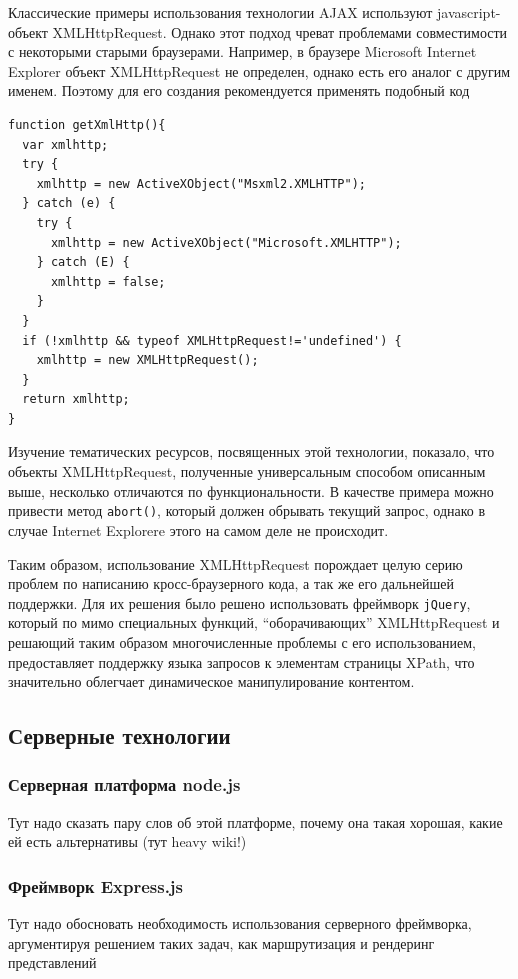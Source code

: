 \documentclass[12pt, a4paper]{article}
\begin{document}
Классические примеры использования технологии AJAX используют javascript-объект
XMLHttpRequest. Однако этот подход чреват проблемами совместимости с некоторыми
старыми браузерами. Например, в браузере Microsoft Internet Explorer объект
XMLHttpRequest не определен, однако есть его аналог с другим именем. Поэтому для
его создания рекомендуется применять подобный код
\begin{lstlisting}
function getXmlHttp(){
  var xmlhttp;
  try {
    xmlhttp = new ActiveXObject("Msxml2.XMLHTTP");
  } catch (e) {
    try {
      xmlhttp = new ActiveXObject("Microsoft.XMLHTTP");
    } catch (E) {
      xmlhttp = false;
    }
  }
  if (!xmlhttp && typeof XMLHttpRequest!='undefined') {
    xmlhttp = new XMLHttpRequest();
  }
  return xmlhttp;
}
\end{lstlisting}
Изучение тематических ресурсов, посвященных этой технологии, показало, что
объекты XMLHttpRequest, полученные универсальным способом описанным выше,
несколько отличаются по функциональности. В качестве примера можно привести
метод \texttt{abort()}, который должен обрывать текущий запрос, однако в случае
Internet Explorere этого на самом деле не происходит.

Таким образом, использование XMLHttpRequest порождает целую серию проблем по
написанию кросс-браузерного кода, а так же его дальнейшей поддержки. Для их
решения было решено использовать фреймворк \texttt{jQuery}, который по мимо
специальных функций, ``оборачивающих'' XMLHttpRequest и решающий таким образом
многочисленные проблемы с его использованием, предоставляет поддержку языка
запросов к элементам страницы XPath, что значительно облегчает динамическое
манипулирование контентом.


\subsection{Серверные технологии}
\subsubsection{Серверная платформа node.js}
Тут надо сказать пару слов об этой платформе, почему она такая хорошая,
какие ей есть альтернативы (тут heavy wiki!)
\subsubsection{Фреймворк Express.js}
Тут надо обосновать необходимость использования серверного фреймворка,
аргументируя решением таких задач, как маршрутизация и рендеринг представлений
\end{document}
